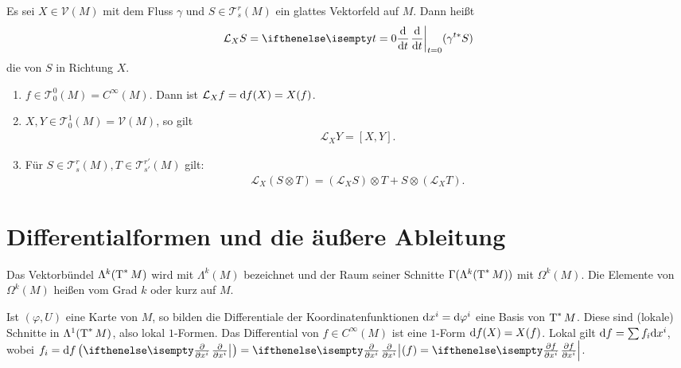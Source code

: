 \begin{Dfn}\label{def-5-5}
  Es sei $X \in \mathcal V(M)$ mit dem Fluss $\gamma$ und $S \in \mathcal T_s^r(M)$ ein glattes Vektorfeld auf $M$. Dann heißt
  \begin{align*}
    \mathcal L_X S = \difffrac[t=0]{}{t}(\gamma^{t*}S)
  \end{align*}
  die  von $S$ in Richtung $X$.
\end{Dfn}

\begin{emptythm}[Eigenschaften]\begin{enumerate}[label=\arabic*)]
\item
	$f \in \mathcal T_0^0(M) = C^{\infty}(M)$. Dann ist $\mathcal L_Xf = \mathrm{d} f (X) = X(f)$.
\item
	$X,Y \in \mathcal T_0^1(M) = \mathcal V(M)$, so gilt
	\begin{align*}
		\mathcal L_XY = [X,Y].
	\end{align*}
\item
	Für $S \in \mathcal T_s^r(M), T \in \mathcal T_{s'}^{r'}(M)$ gilt:
	\begin{align*}
		\mathcal L_X(S \otimes T) = (\mathcal L_XS) \otimes T + S \otimes (\mathcal L_X T).
	\end{align*}
\end{enumerate}\end{emptythm}


\section{Differentialformen und die äußere Ableitung}

\begin{Dfn}
  Das Vektorbündel $\Lambda^k(\operatorname{T}^{*}M)$ wird mit $\Lambda^k(M)$ bezeichnet und der Raum seiner Schnitte $\Gamma(\Lambda^k(\operatorname{T}^{*}M))$ mit $\Omega^k(M)$. Die Elemente von $\Omega^k(M)$ heißen  vom Grad $k$ oder kurz  auf $M$.
\end{Dfn}

Ist $(\varphi, U)$ eine Karte von $M$, so bilden die Differentiale der Koordinatenfunktionen $\mathrm{d} x^i = \mathrm{d} \varphi^i$ eine Basis von $\operatorname{T}^{*}M$.
Diese sind (lokale) Schnitte in $\Lambda^1(\operatorname{T}^{*}M)$, also lokal $1$-Formen. Das Differential von $f \in C^{\infty}(M)$ ist eine $1$-Form $\mathrm{d} f(X) = X(f)$.
Lokal gilt $\mathrm{d} f = \sum f_i \mathrm{d} x^i$, wobei $f_i = \dop f \left(\pdifffrac{}{x^i}\right) = \pdifffrac{}{x^i}(f) = \pdifffrac{f}{x^i}$.

